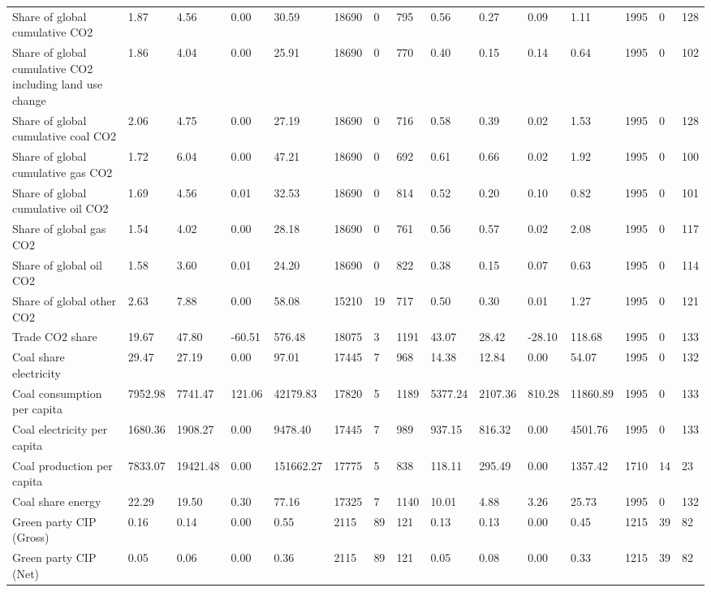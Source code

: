 \begin{longtable}{lllllllllllllll}
\addlinespace
Share of global cumulative CO2 & 1.87 & 4.56 & 0.00 & 30.59 & 18690 & 0 & 795 & 0.56 & 0.27 & 0.09 & 1.11 & 1995 & 0 & 128\\
Share of global cumulative CO2 including land use change & 1.86 & 4.04 & 0.00 & 25.91 & 18690 & 0 & 770 & 0.40 & 0.15 & 0.14 & 0.64 & 1995 & 0 & 102\\
Share of global cumulative coal CO2 & 2.06 & 4.75 & 0.00 & 27.19 & 18690 & 0 & 716 & 0.58 & 0.39 & 0.02 & 1.53 & 1995 & 0 & 128\\
Share of global cumulative gas CO2 & 1.72 & 6.04 & 0.00 & 47.21 & 18690 & 0 & 692 & 0.61 & 0.66 & 0.02 & 1.92 & 1995 & 0 & 100\\
Share of global cumulative oil CO2 & 1.69 & 4.56 & 0.01 & 32.53 & 18690 & 0 & 814 & 0.52 & 0.20 & 0.10 & 0.82 & 1995 & 0 & 101\\
\addlinespace
Share of global gas CO2 & 1.54 & 4.02 & 0.00 & 28.18 & 18690 & 0 & 761 & 0.56 & 0.57 & 0.02 & 2.08 & 1995 & 0 & 117\\
Share of global oil CO2 & 1.58 & 3.60 & 0.01 & 24.20 & 18690 & 0 & 822 & 0.38 & 0.15 & 0.07 & 0.63 & 1995 & 0 & 114\\
Share of global other CO2 & 2.63 & 7.88 & 0.00 & 58.08 & 15210 & 19 & 717 & 0.50 & 0.30 & 0.01 & 1.27 & 1995 & 0 & 121\\
Trade CO2 share & 19.67 & 47.80 & -60.51 & 576.48 & 18075 & 3 & 1191 & 43.07 & 28.42 & -28.10 & 118.68 & 1995 & 0 & 133\\
Coal share electricity & 29.47 & 27.19 & 0.00 & 97.01 & 17445 & 7 & 968 & 14.38 & 12.84 & 0.00 & 54.07 & 1995 & 0 & 132\\
\addlinespace
Coal consumption per capita & 7952.98 & 7741.47 & 121.06 & 42179.83 & 17820 & 5 & 1189 & 5377.24 & 2107.36 & 810.28 & 11860.89 & 1995 & 0 & 133\\
Coal electricity per capita & 1680.36 & 1908.27 & 0.00 & 9478.40 & 17445 & 7 & 989 & 937.15 & 816.32 & 0.00 & 4501.76 & 1995 & 0 & 133\\
Coal production per capita & 7833.07 & 19421.48 & 0.00 & 151662.27 & 17775 & 5 & 838 & 118.11 & 295.49 & 0.00 & 1357.42 & 1710 & 14 & 23\\
Coal share energy & 22.29 & 19.50 & 0.30 & 77.16 & 17325 & 7 & 1140 & 10.01 & 4.88 & 3.26 & 25.73 & 1995 & 0 & 132\\
Green party CIP (Gross) & 0.16 & 0.14 & 0.00 & 0.55 & 2115 & 89 & 121 & 0.13 & 0.13 & 0.00 & 0.45 & 1215 & 39 & 82\\
\addlinespace
Green party CIP (Net) & 0.05 & 0.06 & 0.00 & 0.36 & 2115 & 89 & 121 & 0.05 & 0.08 & 0.00 & 0.33 & 1215 & 39 & 82\\

\end{longtable}
